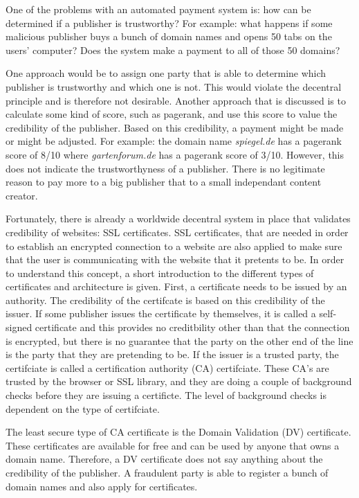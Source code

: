 One of the problems with an automated payment system is: how can be determined if a publisher is trustworthy? For example: what happens if some malicious publisher buys a bunch of domain names and opens 50 tabs on the users' computer? Does the system make a payment to all of those 50 domains? 

One approach would be to assign one party that is able to determine which publisher is trustworthy and which one is not. This would violate the decentral principle and is therefore not desirable. Another approach that is discussed is to calculate some kind of score, such as pagerank, and use this score to value the credibility of the publisher. Based on this credibility, a payment might be made or might be adjusted. For example: the domain name \textit{spiegel.de} has a pagerank score of 8/10 where \textit{gartenforum.de} has a pagerank score of 3/10. However, this does not indicate the trustworthyness of a publisher. There is no legitimate reason to pay more to a big publisher that to a small independant content creator. 

Fortunately, there is already a worldwide decentral system in place that validates credibility of websites: SSL certificates. SSL certificates, that are needed in order to establish an encrypted connection to a website are also applied to make sure that the user is communicating with the website that it pretents to be. In order to understand this concept, a short introduction to the different types of certificates and architecture is given. First, a certificate needs to be issued by an authority. The credibility of the certifcate is based on this credibility of the issuer. If some publisher issues the certificate by themselves, it is called a self-signed certificate and this provides no creditbility other than that the connection is encrypted, but there is no guarantee that the party on the other end of the line is the party that they are pretending to be. If the issuer is a trusted party, the certifciate is called a certification authority (CA) certifciate. These CA's are trusted by the browser or SSL library, and they are doing a couple of background checks before they are issuing a certificte. The level of background checks is dependent on the type of certifciate. 

The least secure type of CA certificate is the Domain Validation (DV) certificate. These certificates are available for free and can be used by anyone that owns a domain name. Therefore, a DV certificate does not say anything about the credibility of the publisher. A fraudulent party is able to register a bunch of domain names and also apply for certificates.

